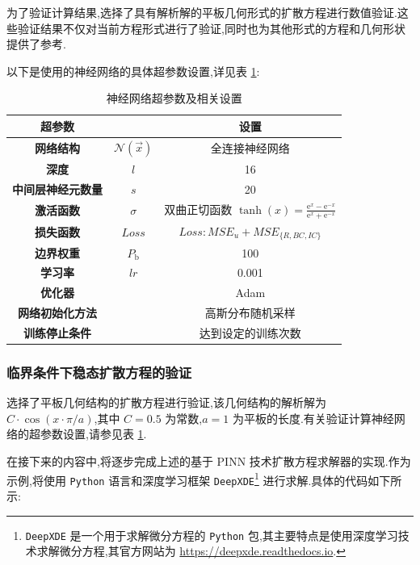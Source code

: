 \documentclass{Sichuan Normal University}
\begin{document}
为了验证计算结果,选择了具有解析解的平板几何形式的扩散方程进行数值验证.这些验证结果不仅对当前方程形式进行了验证,同时也为其他形式的方程和几何形状提供了参考.

以下是使用的神经网络的具体超参数设置,详见表 \ref{tab:hyperparameter_settings}:
\begin{table}[H]
    \caption{神经网络超参数及相关设置}
    \centering
    \begin{tabular}{ccc}
        \toprule
        \textbf{超参数} && \textbf{设置} \\
        \midrule
        \textbf{网络结构} &$\mathcal{N}(\vec{x})$& 全连接神经网络 \\
        \textbf{深度} &$l$& 16 \\
        \textbf{中间层神经元数量}  &$s$& 20 \\
        \textbf{激活函数} &$\sigma$& 双曲正切函数  $\tanh(x)=\frac{\mathrm{e}^x-\mathrm{e}^{-x}}{\mathrm{e}^x+\mathrm{e}^{-x}}$ \\
        \textbf{损失函数} &$Loss$& $Loss: M S E_u+M S E_{\{R, B C, I C\}}$ \\
        \textbf{边界权重}  &$P_{\mathrm{b}}$& 100 \\
        \textbf{学习率} &$lr$& 0.001  \\
        \textbf{优化器} && Adam  \\
        \textbf{网络初始化方法} && 高斯分布随机采样 \\
        \textbf{训练停止条件} && 达到设定的训练次数\\
        \bottomrule
    \end{tabular}
    \label{tab:hyperparameter_settings}
\end{table}
\subsubsection{临界条件下稳态扩散方程的验证}

选择了平板几何结构的扩散方程进行验证,该几何结构的解析解为$C\cdot\cos(x\cdot\pi/a)$,其中 $C=0.5$ 为常数,$a=1$ 为平板的长度.有关验证计算神经网络的超参数设置,请参见表 \ref{tab:hyperparameter_settings}.

在接下来的内容中,将逐步完成上述的基于 PINN 技术扩散方程求解器的实现.作为示例,将使用 \texttt{Python} 语言和深度学习框架 \texttt{DeepXDE}\footnote{\texttt{DeepXDE} \cite{luDeepXDEDeepLearning2021}是一个用于求解微分方程的 \texttt{Python} 包,其主要特点是使用深度学习技术求解微分方程,其官方网站为 \url{https://deepxde.readthedocs.io}.} 进行求解.具体的代码如下所示:
\end{document}
